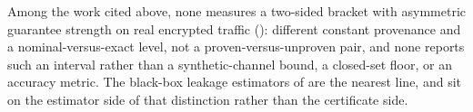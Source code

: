 Among the work cited above, none measures a two-sided bracket with asymmetric
guarantee strength on real encrypted traffic ():
different constant provenance and a nominal-versus-exact level, not a
proven-versus-unproven pair, and none reports such an interval rather than a
synthetic-channel bound, a closed-set floor, or an accuracy metric. The
black-box leakage estimators of  are the nearest line, and
sit on the estimator side of that distinction rather than the certificate side.
\label{sec:related/novelty}
